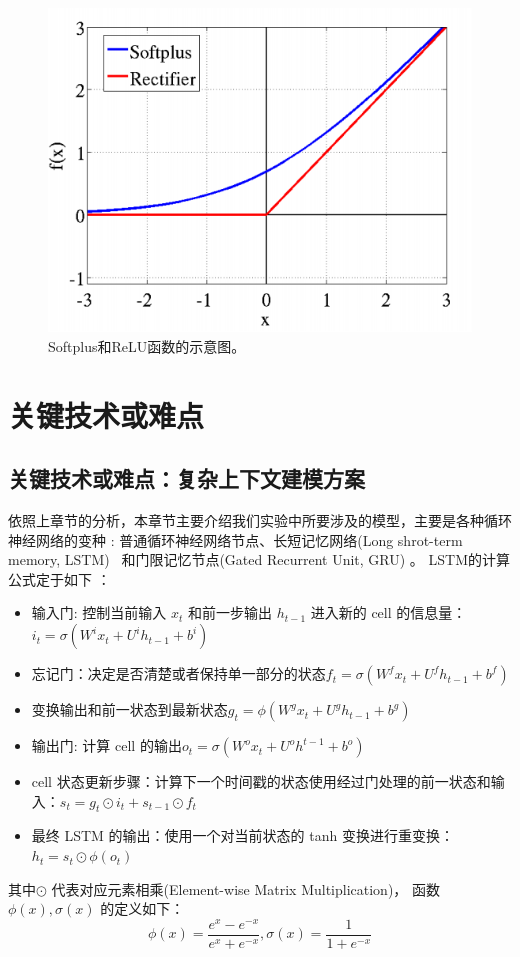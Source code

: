 \documentclass[master,openright,twoside,color]{buaathesis}
\begin{document}
\begin{figure}
  \centering
\includegraphics[width=0.45\linewidth]{./figures/softplus.png}
\caption{Softplus和ReLU函数的示意图。}\label{fig:soft}
\end{figure}

\section{关键技术或难点}

\subsection{关键技术或难点：复杂上下文建模方案}
依照上章节的分析，本章节主要介绍我们实验中所要涉及的模型，主要是各种循环神经网络的变种 : 普通循环神经网络节点、长短记忆网络(Long shrot-term memory, LSTM)~ 和门限记忆节点(Gated Recurrent Unit, GRU) 。 LSTM的计算公式定于如下 ：
\begin{itemize}
\item 输入门: 控制当前输入 $x_t$ 和前一步输出 $h_{t−1}$ 进入新的 cell 的信息量：$i_t=\sigma(W^i x_t+U^i h_{t-1}+b^i)$
\item  忘记门：决定是否清楚或者保持单一部分的状态$f_t=\sigma(W^f x_t+U^f h_{t-1}+b^f)$
\item  变换输出和前一状态到最新状态$g_t=\phi(W^g x_t+U^g h_{t-1}+b^g)$
\item  输出门: 计算 cell 的输出$o_t=\sigma(W^o x_t+U^o h^{t-1}+b^o)$
\item  cell 状态更新步骤：计算下一个时间戳的状态使用经过门处理的前一状态和输入：$s_t=g_t\odot i_t+s_{t-1}\odot f_t$
\item  最终 LSTM 的输出：使用一个对当前状态的 tanh 变换进行重变换：$h_t=s_t\odot \phi(o_t)$
\end{itemize}
其中$\odot$ 代表对应元素相乘(Element-wise Matrix Multiplication)， 函数 $\phi(x), \sigma(x)$ 的定义如下：
\begin{equation}\label{equ:tanh}
  \phi(x)=\frac{e^x-e^{-x}}{e^x+e^{-x}},\sigma(x)=\frac{1}{1+e^{-x}}
\end{equation}
\end{document}
